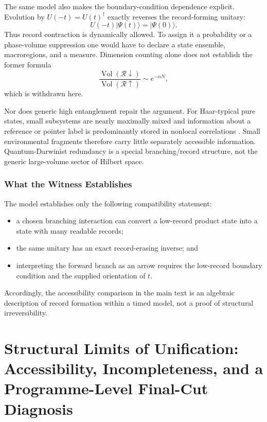 \documentclass[12pt,a4paper,openany]{book}
\begin{document}
The same model also makes the boundary-condition dependence explicit.  Evolution by $U(-t)=U(t)^\dagger$ exactly reverses the record-forming unitary:
\begin{equation}
U(-t)|\Psi(t)\rangle=|\Psi(0)\rangle.
\end{equation}
Thus record contraction is dynamically allowed.  To assign it a probability or a phase-volume suppression one would have to declare a state ensemble, macroregions, and a measure.  Dimension counting alone does not establish the former formula
\begin{equation}
\frac{\operatorname{Vol}(\mathcal R\downarrow)}
{\operatorname{Vol}(\mathcal R\uparrow)}\sim e^{-\alpha N},
\end{equation}
which is withdrawn here.

Nor does generic high entanglement repair the argument.  For Haar-typical pure states, small subsystems are nearly maximally mixed and information about a reference or pointer label is predominantly stored in nonlocal correlations \cite{Page1993,HaydenPreskill2007}.  Small environmental fragments therefore carry little separately accessible information.  Quantum-Darwinist redundancy is a special branching/record structure, not the generic large-volume sector of Hilbert space.

\subsection{What the Witness Establishes}

The model establishes only the following compatibility statement:
\begin{itemize}
    \item a chosen branching interaction can convert a low-record product state into a state with many readable records;
    \item the same unitary has an exact record-erasing inverse; and
    \item interpreting the forward branch as an arrow requires the low-record boundary condition and the supplied orientation of $t$.
\end{itemize}
Accordingly, the accessibility comparison in the main text is an algebraic description of record formation within a timed model, not a proof of structural irreversibility.

\chapter{Structural Limits of Unification: Accessibility, Incompleteness, and a Programme-Level Final-Cut Diagnosis}
\label{chap:paperG}
\end{document}
